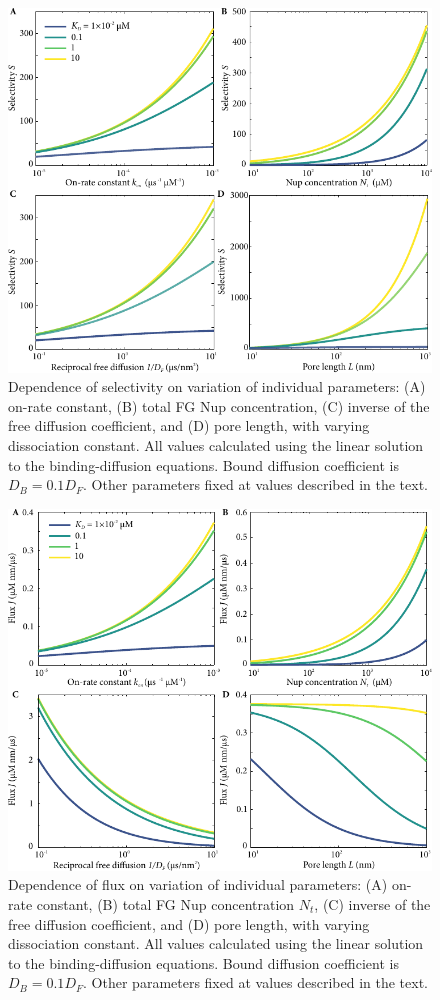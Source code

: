 \begin{figure}[t!]
\centering
\includegraphics[width=0.8\linewidth]{figs/ch02/parameter-variations.pdf}
\caption[Dependence of selectivity on model parameters.]{Dependence of selectivity on variation of individual
  parameters: (A) on-rate constant, (B) total FG Nup concentration, (C) inverse of the free diffusion coefficient, and (D) pore
  length, with varying dissociation constant. All values calculated using the linear solution to the binding-diffusion equations.  Bound diffusion coefficient is $D_B = 0.1D_F$. Other parameters fixed at values described in the text.}
\label{fig:parameter-variations}
\end{figure}

\begin{figure}[t!]
\centering
\includegraphics[width=0.8\linewidth]{figs/ch02/parameter-variations-abs-flux.pdf}
\caption[Dependence of absolute flux on model parameters.]{Dependence of flux on variation of individual parameters: (A) on-rate constant, (B) total FG Nup concentration $N_t$, (C) inverse
  of the free diffusion coefficient, and (D) pore length, with varying
  dissociation constant. All values calculated using the linear solution to the binding-diffusion equations. Bound diffusion coefficient is $D_B = 0.1D_F$. Other parameters fixed at values described in the text.}
\label{fig:parameter-variations-abs-flux}
\end{figure}

